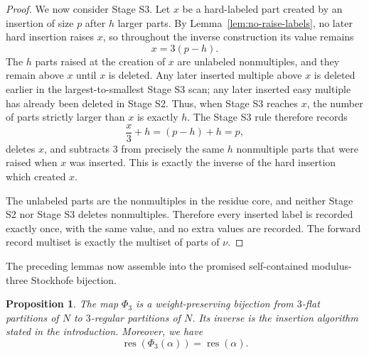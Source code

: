 \documentclass[11pt]{amsart}
\newtheorem{proposition}[theorem]{Proposition}
\theoremstyle{definition}
\theoremstyle{remark}
\newcommand{\res}{\operatorname{res}}
\begin{document}
\begin{proof}
\smallskip
We now consider Stage S3.  Let $x$ be a hard-labeled part created by an insertion of size $p$ after $h$ larger parts.  By Lemma~\ref{lem:no-raise-labels}, no later hard insertion raises $x$, so throughout the inverse construction its value remains
\[
        x=3(p-h).
\]
The $h$ parts raised at the creation of $x$ are unlabeled nonmultiples, and they remain above $x$ until $x$ is deleted.  Any later inserted multiple above $x$ is deleted earlier in the largest-to-smallest Stage S3 scan; any later inserted easy multiple has already been deleted in Stage S2.  Thus, when Stage S3 reaches $x$, the number of parts strictly larger than $x$ is exactly $h$.  The Stage S3 rule therefore records
\[
        \frac{x}{3}+h=(p-h)+h=p,
\]
deletes $x$, and subtracts $3$ from precisely the same $h$ nonmultiple parts that were raised when $x$ was inserted.  This is exactly the inverse of the hard insertion which created $x$.

The unlabeled parts are the nonmultiples in the residue core, and neither Stage S2 nor Stage S3 deletes nonmultiples.  Therefore every inserted label is recorded exactly once, with the same value, and no extra values are recorded.  The forward record multiset is exactly the multiset of parts of $\nu$.
\end{proof}
The preceding lemmas now assemble into the promised self-contained modulus-three Stockhofe bijection.

\begin{proposition}\label{prop:phi}
The map $\Phi_3$ is a weight-preserving bijection from $3$-flat partitions of $N$ to $3$-regular partitions of $N$.  Its inverse is the insertion algorithm stated in the introduction.  Moreover, we have
\[
        \res(\Phi_3(\alpha))=\res(\alpha).
\]
\end{proposition}
\end{document}
